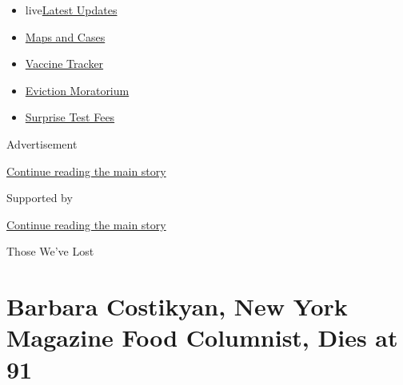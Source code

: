 \begin{itemize}
\tightlist
\item
  live\href{https://www.nytimes3xbfgragh.onion/2020/09/09/world/covid-coronavirus.html?name=promo-coronavirus-obits\&region=TOP_BANNER\&block=storyline_menu_recirc\&action=click\&pgtype=Article\&impression_id=f99f2411-f2da-11ea-b8cd-7399ba641282\&variant=undefined}{Latest
  Updates}
\item
  \href{https://www.nytimes3xbfgragh.onion/interactive/2020/us/coronavirus-us-cases.html?name=promo-coronavirus-obits\&region=TOP_BANNER\&block=storyline_menu_recirc\&action=click\&pgtype=Article\&impression_id=f99f2412-f2da-11ea-b8cd-7399ba641282\&variant=undefined}{Maps
  and Cases}
\item
  \href{https://www.nytimes3xbfgragh.onion/interactive/2020/science/coronavirus-vaccine-tracker.html?name=promo-coronavirus-obits\&region=TOP_BANNER\&block=storyline_menu_recirc\&action=click\&pgtype=Article\&impression_id=f99f2413-f2da-11ea-b8cd-7399ba641282\&variant=undefined}{Vaccine
  Tracker}
\item
  \href{https://www.nytimes3xbfgragh.onion/2020/09/02/your-money/eviction-moratorium-covid.html?name=promo-coronavirus-obits\&region=TOP_BANNER\&block=storyline_menu_recirc\&action=click\&pgtype=Article\&impression_id=f99f2414-f2da-11ea-b8cd-7399ba641282\&variant=undefined}{Eviction
  Moratorium}
\item
  \href{https://www.nytimes3xbfgragh.onion/2020/09/09/upshot/coronavirus-surprise-test-fees.html?name=promo-coronavirus-obits\&region=TOP_BANNER\&block=storyline_menu_recirc\&action=click\&pgtype=Article\&impression_id=f99f4b20-f2da-11ea-b8cd-7399ba641282\&variant=undefined}{Surprise
  Test Fees}
\end{itemize}

Advertisement

\protect\hyperlink{after-top}{Continue reading the main story}

Supported by

\protect\hyperlink{after-sponsor}{Continue reading the main story}

Those We've Lost

\hypertarget{barbara-costikyan-new-york-magazine-food-columnist-dies-at-91}{%
\section{Barbara Costikyan, New York Magazine Food Columnist, Dies at
91}\label{barbara-costikyan-new-york-magazine-food-columnist-dies-at-91}}

